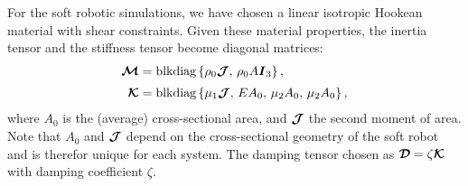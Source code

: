 For the soft robotic simulations, we have chosen a linear isotropic Hookean material with shear constraints. %
Given these material properties, the inertia tensor and the stiffness tensor become diagonal matrices:
%
\begin{align*}
\boldsymbol{\mathcal{M}} & = \textnormal{blkdiag}\left\{ { \rho_0 \boldsymbol{\mathcal{J}},\, \rho_0 A \boldsymbol{I}_3} \right\}, \\[0.25em] 
\boldsymbol{\mathcal{K}} & = \textnormal{blkdiag}\left\{ {\mu_1 \boldsymbol{\mathcal{J}},\, E A_0,\, \mu_2  A_0,\,\mu_2  A_0} \right\},
\end{align*}
%
 where $A_0$ is the (average) cross-sectional area, and $\boldsymbol{\mathcal{J}}$ the second moment of area. Note that $A_0$ and $\boldsymbol{\mathcal{J}}$ depend on the cross-sectional geometry of the soft robot and is therefor unique for each system.  The damping tensor chosen as $\boldsymbol{\mathcal{D}} = \zeta \boldsymbol{\mathcal{K}}$ with damping coefficient $\zeta$. %

